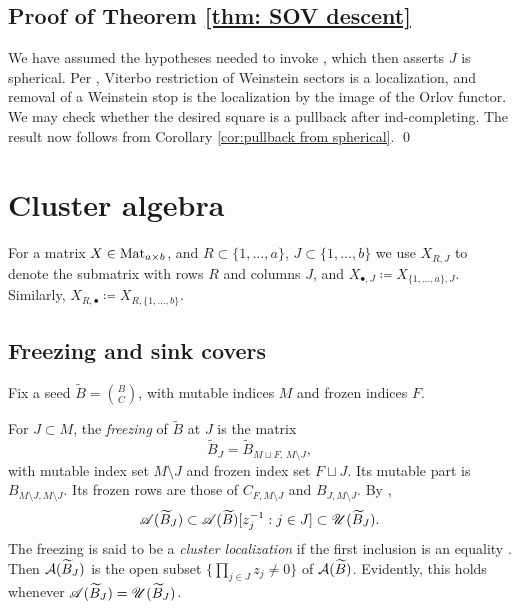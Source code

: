 \documentclass[12pt, letter]{amsart}
\theoremstyle{definition}
\begin{document}
\subsection{Proof of Theorem \ref{thm: SOV descent}}
We have assumed the hypotheses needed to invoke \cite[Thm. 1.3]{Sy}, which then asserts  $J$ is spherical. 
Per \cite{GPS2}, Viterbo restriction of Weinstein sectors is a localization, and removal of a Weinstein stop is the localization by the image of the Orlov functor.    We may check whether the desired square is a pullback after ind-completing. The result now follows from  Corollary \ref{cor:pullback from spherical}. \qed



\section{Cluster algebra}

For a matrix \(X \in \operatorname{Mat}_{a \times b}\), and \( R \subset \{1, \dots, a\}\), \( J \subset \{1, \dots, b\} \) we use \(X_{R, J}\) to denote the submatrix with rows \(R\) and columns \( J\), and \( X_{\bullet, J} \coloneqq X_{ \{1, \dots, a\}, J} \). Similarly, \(X_{R, \bullet} \coloneqq X_{R, \{1, \dots, b\}}\). 

\subsection{Freezing and sink covers}


Fix a seed $\widetilde B = \binom BC$, with mutable indices $M$ and frozen indices $F$. 

For $J\subset M$, the \emph{freezing} of $\widetilde B$ at $J$ is the matrix
\[
 \widetilde B_J=\widetilde B_{M\sqcup F,\,M\setminus J},
\]
with mutable index set $M\setminus J$ and frozen index set $F\sqcup J$.
Its mutable part is $B_{M\setminus J,M\setminus J}$.
Its frozen rows are those of $C_{F,M\setminus J}$ and $B_{J,M\setminus J}$.
By \cite[Proposition~3.1]{M},
\begin{equation}\label{eq:freezing-sandwich}
 \mathscr{A}(\widetilde B_J)\subset\mathscr{A}(\widetilde B)[z_j^{-1}:j\in J]\subset\mathscr{U}(\widetilde B_J).
\end{equation}
The freezing is said to be a \emph{cluster localization} if the first inclusion is an equality \cite[Definition~3.3]{M}.
Then $\mathcal{A}(\widetilde B_J)$ is the open subset $\{\prod_{j\in J}z_j\ne0\}$ of $\mathcal{A}(\widetilde B)$.
Evidently, this holds whenever $\mathscr{A}(\widetilde B_J)=\mathscr{U}(\widetilde B_J)$.
\end{document}
